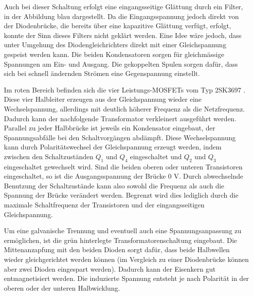 Auch bei dieser Schaltung erfolgt eine eingangsseitige Glättung durch ein Filter, in der Abbildung blau dargestellt. Da die Eingangsspannung jedoch direkt von der Diodenbrücke, die bereits über eine kapazitive Glättung verfügt, erfolgt, konnte der Sinn dieses Filters nicht geklärt werden. Eine Idee wäre jedoch, dass unter Umgehung des Diodengleichrichters direkt mit einer Gleichspannung gespeist werden kann. Die beiden Kondensatoren sorgen für gleichmässige Spannungen am Ein- und Ausgang. Die gekoppelten Spulen sorgen dafür, dass sich bei schnell ändernden Strömen eine Gegenspannung einstellt.

Im roten Bereich befinden sich die vier Leistungs-MOSFETs vom Typ 2SK3697 \cite{2sk3697}. Diese vier Halbleiter erzeugen aus der Gleichspannung wieder eine Wechselspannung, allerdings mit deutlich höherer Frequenz als die Netzfrequenz. Dadurch kann der nachfolgende Transformator verkleinert ausgeführt werden. Parallel zu jeder Halbbrücke ist jeweils ein Kondensator eingebaut, der Spannungsabfälle bei den Schaltvorgängen abdämpft. Diese Wechselspannung kann durch Polaritätswechsel der Gleichspannung erzeugt werden, indem zwischen den Schaltzuständen $Q_1$ und $Q_4$ eingeschaltet und $Q_2$ und $Q_3$ eingeschaltet gewechselt wird. Sind die beiden oberen oder unteren Transistoren eingeschaltet, so ist die Ausgangsspannung der Brücke $0$ V. Durch abwechselnde Benutzung der Schaltzustände kann also sowohl die Frequenz als auch die Spannung der Brücke verändert werden. Begrenzt wird dies lediglich durch die maximale Schaltfrequenz der Transistoren und der eingangsseitigen Gleichspannung.

Um eine galvanische Trennung und eventuell auch eine Spannungsanpassung zu ermöglichen, ist die grün hinterlegte Transformatorenschaltung eingebaut. Die Mittenanzapfung mit den beiden Dioden sorgt dafür, dass beide Halbwellen wieder gleichgerichtet werden können (im Vergleich zu einer Diodenbrücke können aber zwei Dioden eingespart werden). Dadurch kann der Eisenkern gut entmagnetisiert werden. Die induzierte Spannung entsteht je nach Polarität in der oberen oder der unteren Halbwicklung.

